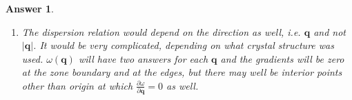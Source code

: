 \documentclass[a4paper]{article}
\newtheorem{ans}{Answer}[subsection]
\theoremstyle{new}
\begin{document}
\begin{ans}
\begin{enumerate}[label=(\roman*)]
\begin{center}
\end{center}
The labelled $\omega$ quantities are
$$\omega_{max}=\sqrt{\frac{2\alpha(m+M)}{Mm}},\quad\omega_1=\sqrt{\frac{2\alpha}{M}},~\omega_2=\sqrt{\frac{2\alpha}{m}}$$
Hence, the gap at the edge of the first BZ is
$$\Delta\omega=\sqrt{\frac{2\alpha}{m}}-\sqrt{\frac{2\alpha}{M}}$$
\item The dispersion relation would depend on the direction as well, i.e. $\mathbf{q}$ and not $|\mathbf{q}|$. It would be very complicated, depending on what crystal structure was used. $\omega(\mathbf{q})$ will have two answers for each $\mathbf{q}$ and the gradients will be zero at the zone boundary and at the edges, but there may well be interior points other than origin at which $\frac{\partial\omega}{\partial\mathbf{q}}=0$ as well.
\end{enumerate}
\end{ans}
\end{document}
